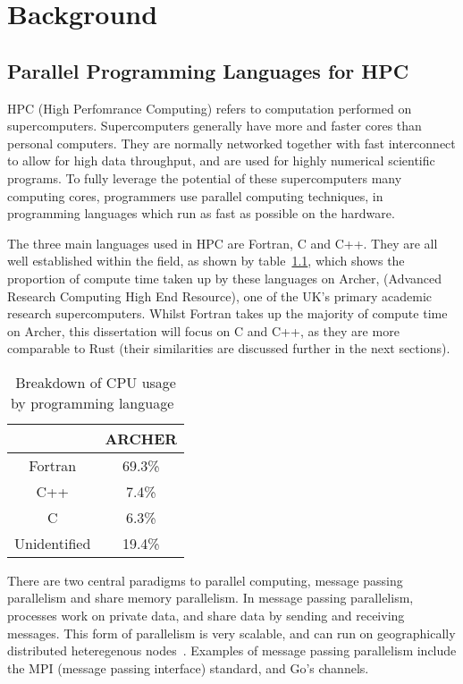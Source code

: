 \chapter{Background}
\section{Parallel Programming Languages for HPC}
HPC (High Perfomrance Computing) refers to computation performed on supercomputers. 
Supercomputers generally have more and faster cores than personal computers. They are normally networked together with fast interconnect to allow for high data throughput, and are used for highly numerical scientific programs.
To fully leverage the potential of these supercomputers many computing cores, programmers use parallel computing techniques, in programming languages which run as fast as possible on the hardware.

The three main languages used in HPC are Fortran, C and C++. They are all well established within the field, as shown by table~\ref{tab:langs}, which shows the proportion of compute time taken up by these languages on Archer, (Advanced Research Computing High End Resource), one of the UK's primary academic research supercomputers.
Whilst Fortran takes up the majority of compute time on Archer, this dissertation will focus on C and C++, as they are more comparable to Rust (their similarities are discussed further in the next sections).

\begin{table}[h]
  \centering
  \begin{tabular}{|c|c|}
    \hline
    & \textbf{ARCHER} \\
    \hline
    Fortran & 69.3\% \\
    \hline
    C++ & 7.4\% \\
    \hline
    C & 6.3\% \\
    \hline
    Unidentified & 19.4\% \\
    \hline
  \end{tabular}
  \caption{Breakdown of CPU usage by programming language~\cite{Turner2015}}
  \label{tab:langs}
\end{table}

There are two central paradigms to parallel computing, message passing parallelism and share memory parallelism. In message passing parallelism, processes work on private data, and share data by sending and receiving messages. This form of parallelism is very scalable, and can run on geographically distributed heteregenous nodes~\cite{SETI}. Examples of message passing parallelism include the MPI (message passing interface) standard, and Go's channels.

